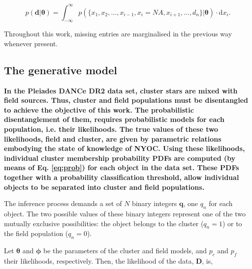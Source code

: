 \begin{equation}
\label{eq:marginalmiss}
p(\mathbf{d}|\mathbf{\theta})= \int_{-\infty}^{\infty} p(\{x_1,x_2,...,x_{i-1},x_{i}= NA,x_{i+1},...,d_n\}|\mathbf{\theta})\cdot \mathrm{d}x_{i}.
\end{equation}

Throughout this work, missing entries are marginalised in the previous way whenever present.


\subsection{The generative model}
\label{sect:generative-model}
\textbf{In the Pleiades DANCe DR2 data set, cluster stars are mixed with field sources. Thus, cluster and field populations must be disentangled to achieve the objective of this work. The probabilistic disentanglement of them, requires probabilistic models for each population, i.e. their likelihoods. The true values of these two likelihoods, field and cluster, are given by parametric relations embodying the state of knowledge of NYOC.  Using these likelihoods, individual cluster membership probability PDFs are computed (by means of Eq. \ref{eq:prob}) for each object in the data set. These PDFs together with a probability classification threshold,  allow individual objects to be separated into cluster and field populations.}

The inference process demands a set of $N$ binary integers $\mathbf{q}$, one $q_n$ for each object. The two possible values of these binary integers represent one of the two mutually exclusive possibilities: the object belongs to the cluster ($q_n=1$) or to the field population ($q_n=0$). 

Let $\boldsymbol{\theta}$ and $\boldsymbol{\phi}$ be the parameters of the cluster and field models, and $p_c$ and $p_f$ their likelihoods, respectively. Then, the likelihood of the data, $\mathbf{D}$, is,

